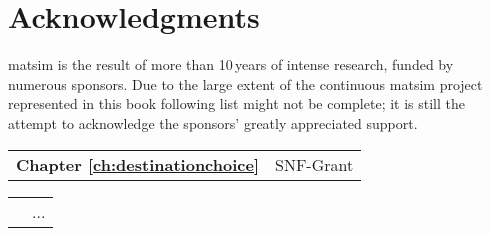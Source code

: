\chapter*{Acknowledgments}
\gls{matsim} is the result of more than 10\,years of intense research, funded by numerous sponsors. Due to the large extent of the continuous \gls{matsim} project represented in this book following list might not be complete; it is still the attempt to acknowledge the sponsors' greatly appreciated support. 

\begin{tabular}[width=0.48\textwidth]{@{}l l}
\textbf{Chapter \ref{ch:destinationchoice}} & SNF-Grant  \\
\end{tabular}


\begin{tabular}[width=0.48\textwidth]{@{}l l}
\textbf{Chapter \ref}{}} & ... \\
\end{tabular}

